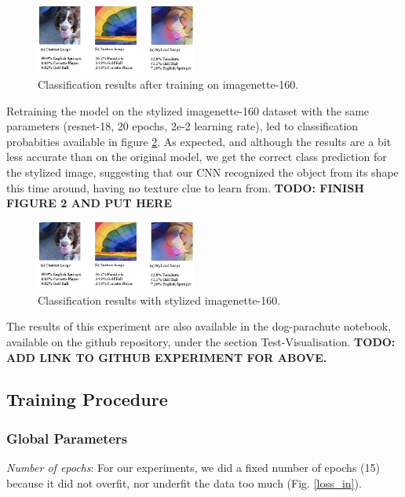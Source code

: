 \documentclass{article}
\begin{document}
\begin{figure}[h!]\center
  \includegraphics[width=0.47\textwidth]{imgs/results-textures}
  \caption{Classification results after training on imagenette-160.}
  \label{dog-parachute}
\end{figure}

\noindent
Retraining the model on the stylized imagenette-160 dataset with the same parameters 
(resnet-18, 20 epochs, 2e-2 learning rate), 
led to classification probabities available in figure \ref{stylized-dog-parachute}.
As expected, and although the results are a bit less accurate than on the original model, 
we get the correct class prediction for the stylized image, suggesting that our CNN recognized the object
from its shape this time around, having no texture clue to learn from.
\textbf{TODO: FINISH FIGURE 2 AND PUT HERE}

\begin{figure}[h!]\center
  \includegraphics[width=0.47\textwidth]{imgs/results-textures}
  \caption{Classification results with stylized imagenette-160.}
  \label{stylized-dog-parachute}
\end{figure}

\noindent
The results of this experiment are also available in the dog-parachute notebook, 
available on the github repository, under the section Test-Visualisation.
\textbf{TODO: ADD LINK TO GITHUB EXPERIMENT FOR ABOVE.}

\subsection{Training Procedure}


\subsubsection{Global Parameters}

\textit{Number of epochs}: For our experiments, we did a fixed number of epochs
 (15) because it did not overfit, nor underfit the data too much (Fig. \ref{loss_in}).
\end{document}
